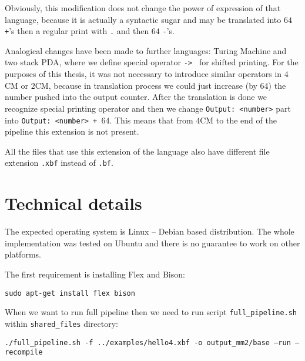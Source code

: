\documentclass[english,shortabstract,mgr]{iithesis}
\begin{document}
Obviously, this modification does not change the power of expression
of that language, because it is actually a syntactic sugar and may be translated
into $64$ \texttt{+}'s then a regular print with \texttt{.} and then $64$ \texttt{-}'s.

Analogical changes have been made to further languages: Turing Machine and two
stack PDA, where we define special operator \texttt{->~} for shifted printing.
For the purposes of this thesis, it was not necessary to introduce similar
operators in $4$CM or $2$CM, because in translation process we could just
increase (by $64$) the number pushed into the output counter. After the translation
is done we recognize special printing operator and then we change \texttt{Output: <number>}
part into \texttt{Output:~<number>~+~$64$}. This means that from $4$CM
to the end of the pipeline this extension is not present.

All the files that use this extension of the language also have different file
extension \texttt{.xbf} instead of \texttt{.bf}.

\section{Technical details}

The expected operating system is Linux -- Debian based distribution. The whole implementation
was tested on Ubuntu and there is no guarantee to work on other platforms.

The first requirement is installing Flex and Bison:

\texttt{sudo apt-get install flex bison}

When we want to run full pipeline then we need to run script \texttt{full\_pipeline.sh} within
\texttt{shared\_files} directory:

\hspace{-1.25cm}
\texttt{./full\_pipeline.sh -f ../examples/hello4.xbf -o output\_mm2/base --run --recompile}
\end{document}
